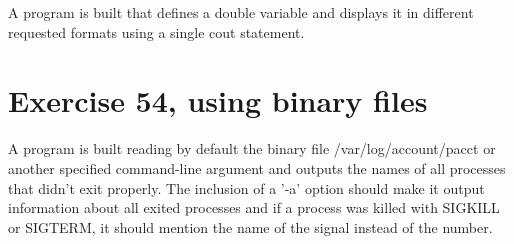 \documentclass[11pt]{article}
\begin{document}
A program is built that defines a double variable and displays it in different requested formats using a single cout statement.



\section*{Exercise 54, using binary files}

A program is built reading by default the binary file /var/log/account/pacct or another specified command-line argument and outputs the names of all processes that didn't exit properly. The inclusion of a '-a' option should make it output information about all exited processes and if a process was killed with SIGKILL or SIGTERM, it should mention the name of the signal instead of the number.







\end{document}
